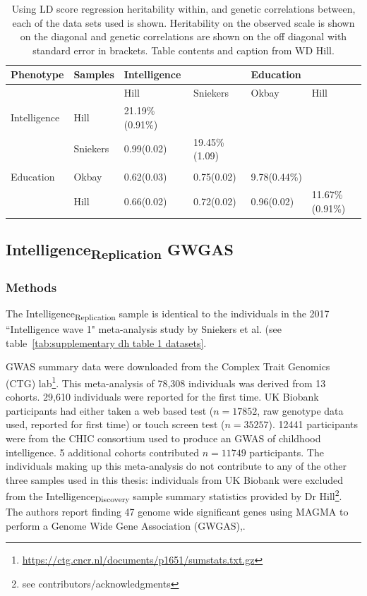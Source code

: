 \begin{table}[]
    \centering
    \begin{tabular}{l|lllll}
    \toprule
       Phenotype & Samples & Intelligence & & Education &    \\
       \midrule
         & & Hill & Sniekers & Okbay & Hill\\
         \midrule
         Intelligence & Hill & 21.19\%(0.91\%) & & & \\
         & Sniekers & 0.99(0.02) & 19.45\%(1.09) & & \\
         \\
         Education & Okbay & 0.62(0.03) & 0.75(0.02) & 9.78(0.44\%) &\\
         & Hill & 0.66(0.02) & 0.72(0.02) & 0.96(0.02)&11.67\%(0.91\%)\\
         \bottomrule
    \end{tabular}
    \caption[Heritability of samples]{Using LD score regression heritability within, and genetic correlations between, each of the data sets used is shown. Heritability on the observed scale is shown on the diagonal and genetic correlations are shown on the off diagonal with standard error in brackets. Table contents and caption from WD Hill. }
    \label{tab:supplementary LD regression hill}
\end{table}
\subsection{Intelligence\textsubscript{Replication} GWGAS}
\label{sec:Intelligence Replication GWGAS}

\subsubsection{Methods}
The Intelligence\textsubscript{Replication} sample is identical to the individuals in the 2017 ``Intelligence wave 1" meta-analysis study by Sniekers et al. \cite{sniekers2017genome} (see table~\ref{tab:supplementary dh table 1 datasets}. 

GWAS summary data were downloaded from the Complex Trait Genomics (CTG) lab\footnote{ \url{https://ctg.cncr.nl/documents/p1651/sumstats.txt.gz}}. This meta-analysis of 78,308 individuals was derived from 13 cohorts. 29,610 individuals were reported for the first time. UK Biobank participants had either taken a web based test ($n=17852$, raw genotype data used, reported for first time) or touch screen test ($n=35257$). 12441 participants were from the CHIC consortium used to produce an GWAS of childhood intelligence\cite{benyamin2014childhood}. 5 additional cohorts contributed $n=11 749$ participants. The individuals making up this meta-analysis do not contribute to any of the other three samples used in this thesis: individuals from UK Biobank were excluded from the Intelligence\textsubscript{Discovery} sample summary statistics provided by Dr Hill\footnote{see contributors/acknowledgments}. The authors report finding 47 genome wide significant genes using MAGMA to perform a Genome Wide Gene Association (GWGAS)\cite{sniekers2017genome},\cite{de2015magma}.

